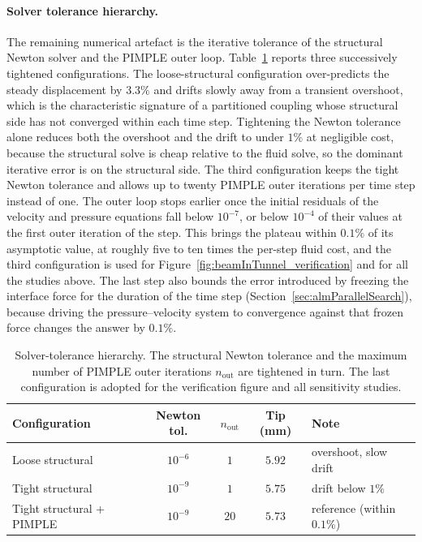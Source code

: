\paragraph{Solver tolerance hierarchy.}
The remaining numerical artefact is the iterative tolerance of the structural Newton solver and the PIMPLE outer loop. Table~\ref{tab:beamtunnel_tol_cases} reports three successively tightened configurations. The loose-structural configuration over-predicts the steady displacement by $3.3\%$ and drifts slowly away from a transient overshoot, which is the characteristic signature of a partitioned coupling whose structural side has not converged within each time step. Tightening the Newton tolerance alone reduces both the overshoot and the drift to under $1\%$ at negligible cost, because the structural solve is cheap relative to the fluid solve, so the dominant iterative error is on the structural side. The third configuration keeps the tight Newton tolerance and allows up to twenty PIMPLE outer iterations per time step instead of one. The outer loop stops earlier once the initial residuals of the velocity and pressure equations fall below $10^{-7}$, or below $10^{-4}$ of their values at the first outer iteration of the step. This brings the plateau within $0.1\%$ of its asymptotic value, at roughly five to ten times the per-step fluid cost, and the third configuration is used for Figure~\ref{fig:beamInTunnel_verification} and for all the studies above. The last step also bounds the error introduced by freezing the interface force for the duration of the time step (Section~\ref{sec:almParallelSearch}), because driving the pressure--velocity system to convergence against that frozen force changes the answer by $0.1\%$.

\begin{table}[!ht]
\centering
\small
\caption{Solver-tolerance hierarchy. The structural Newton tolerance and the maximum number of PIMPLE outer iterations $n_{\mathrm{out}}$ are tightened in turn. The last configuration is adopted for the verification figure and all sensitivity studies.}
\label{tab:beamtunnel_tol_cases}
\setlength{\tabcolsep}{5pt}
\renewcommand{\arraystretch}{1.15}
\begin{tabular}{l c c c l}
\toprule
Configuration & Newton tol. & $n_{\mathrm{out}}$ & Tip (mm) & Note \\
\midrule
Loose structural          & $10^{-6}$ & $1$  & $5.92$ & overshoot, slow drift \\
Tight structural          & $10^{-9}$ & $1$  & $5.75$ & drift below $1\%$ \\
Tight structural + PIMPLE & $10^{-9}$ & $20$ & $5.73$ & reference (within $0.1\%$) \\
\bottomrule
\end{tabular}
\end{table}

